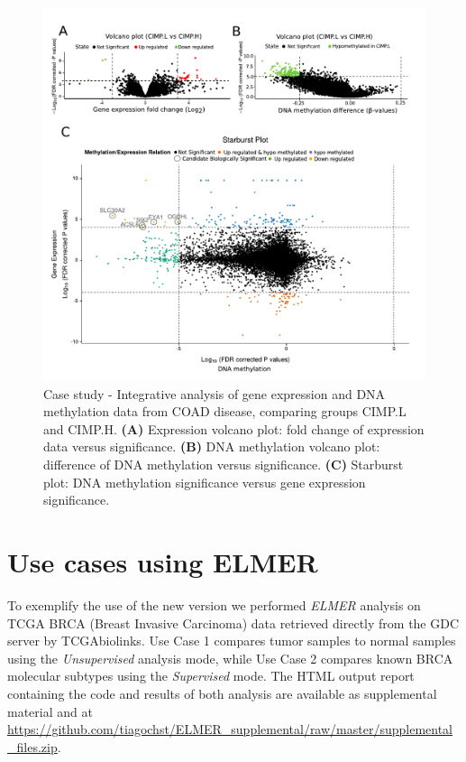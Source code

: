 \begin{figure}
\centering
\includegraphics[width=1.0\linewidth]{images/figure5.pdf}
\caption[Case study - Integrative data analysis of Colon Adenocarcinoma]{
Case study - Integrative analysis of gene expression and DNA methylation data from COAD disease,
comparing groups CIMP.L and CIMP.H. \textbf{(A)} Expression volcano plot: fold change of expression data versus significance.
 \textbf{(B)} DNA methylation volcano plot: difference of DNA methylation versus significance.
 \textbf{(C)} Starburst plot: DNA methylation significance versus gene expression significance.}
\label{fig:case_starburst}
\end{figure}


\section{Use cases using ELMER}\label{sec:analysis_elmer}

To exemplify the use of the new version we performed \textit{ELMER} analysis on TCGA BRCA (Breast Invasive Carcinoma) data retrieved directly from the GDC server by TCGAbiolinks. Use Case 1 compares tumor samples to normal samples using the \textit{Unsupervised} analysis mode, while Use Case 2 compares known BRCA molecular subtypes using the \textit{Supervised} mode. The HTML output report containing the code and results of both analysis are available as supplemental material and at \url{https://github.com/tiagochst/ELMER_supplemental/raw/master/supplemental_files.zip}.

